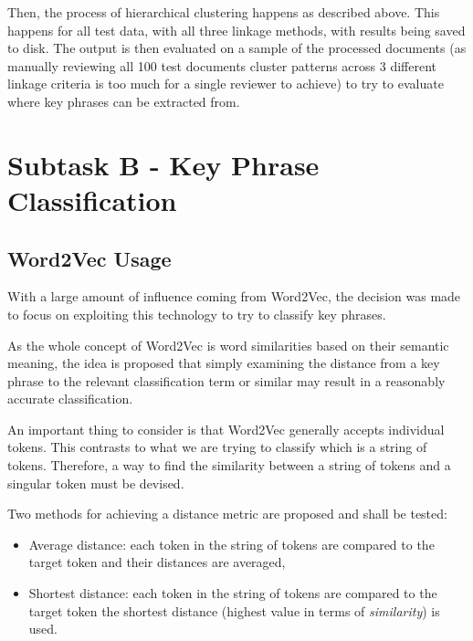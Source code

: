 Then, the process of hierarchical clustering happens as described above. This happens for all test data, with all three linkage methods, with results being saved to disk. The output is then evaluated on a sample of the processed documents (as manually reviewing all 100 test documents cluster patterns across 3 different linkage criteria is too much for a single reviewer to achieve) to try to evaluate where key phrases can be extracted from.

\section{Subtask B - Key Phrase Classification}
\subsection{Word2Vec Usage}
With a large amount of influence coming from Word2Vec, the decision was made to focus on exploiting this technology to try to classify key phrases.

As the whole concept of Word2Vec is word similarities based on their semantic meaning, the idea is proposed that simply examining the distance from a key phrase to the relevant classification term or similar may result in a reasonably accurate classification. 

An important thing to consider is that Word2Vec generally accepts individual tokens. This contrasts to what we are trying to classify which is a string of tokens. Therefore, a way to find the similarity between a string of tokens and a singular token must be devised.

Two methods for achieving a distance metric are proposed and shall be tested:
\begin{itemize}
	\item Average distance: each token in the string of tokens are compared to the target token and their distances are averaged,
	\item Shortest distance: each token in the string of tokens are compared to the target token the shortest distance (highest value in terms of \textit{similarity}) is used.
\end{itemize}

